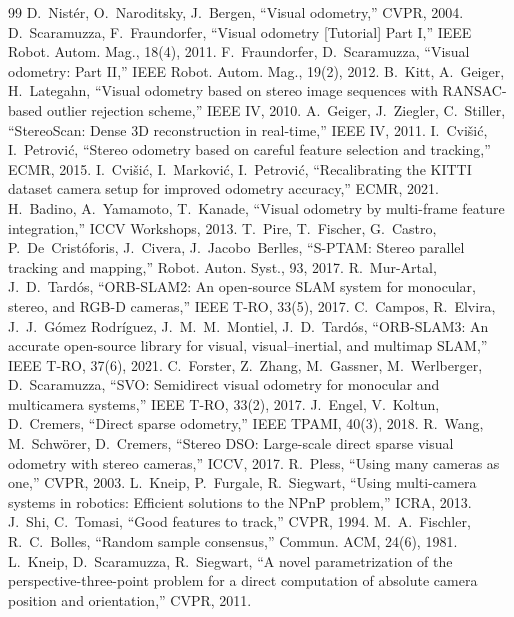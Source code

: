 \documentclass[11pt,a4paper]{article}
\begin{document}
\begingroup\small
\begin{thebibliography}{99}\setlength{\itemsep}{0pt}
 D.~Nist\'er, O.~Naroditsky, J.~Bergen, ``Visual odometry,'' CVPR, 2004.
 D.~Scaramuzza, F.~Fraundorfer, ``Visual odometry [Tutorial] Part I,'' IEEE Robot. Autom. Mag., 18(4), 2011.
 F.~Fraundorfer, D.~Scaramuzza, ``Visual odometry: Part II,'' IEEE Robot. Autom. Mag., 19(2), 2012.
 B.~Kitt, A.~Geiger, H.~Lategahn, ``Visual odometry based on stereo image sequences with RANSAC-based outlier rejection scheme,'' IEEE IV, 2010.
 A.~Geiger, J.~Ziegler, C.~Stiller, ``StereoScan: Dense 3D reconstruction in real-time,'' IEEE IV, 2011.
 I.~Cvi\v{s}i\'c, I.~Petrovi\'c, ``Stereo odometry based on careful feature selection and tracking,'' ECMR, 2015.
 I.~Cvi\v{s}i\'c, I.~Markovi\'c, I.~Petrovi\'c, ``Recalibrating the KITTI dataset camera setup for improved odometry accuracy,'' ECMR, 2021.
 H.~Badino, A.~Yamamoto, T.~Kanade, ``Visual odometry by multi-frame feature integration,'' ICCV Workshops, 2013.
 T.~Pire, T.~Fischer, G.~Castro, P.~De~Crist\'oforis, J.~Civera, J.~Jacobo~Berlles, ``S-PTAM: Stereo parallel tracking and mapping,'' Robot. Auton. Syst., 93, 2017.
 R.~Mur-Artal, J.~D.~Tard\'os, ``ORB-SLAM2: An open-source SLAM system for monocular, stereo, and RGB-D cameras,'' IEEE T-RO, 33(5), 2017.
 C.~Campos, R.~Elvira, J.~J.~G\'omez Rodr\'iguez, J.~M.~M.~Montiel, J.~D.~Tard\'os, ``ORB-SLAM3: An accurate open-source library for visual, visual--inertial, and multimap SLAM,'' IEEE T-RO, 37(6), 2021.
 C.~Forster, Z.~Zhang, M.~Gassner, M.~Werlberger, D.~Scaramuzza, ``SVO: Semidirect visual odometry for monocular and multicamera systems,'' IEEE T-RO, 33(2), 2017.
 J.~Engel, V.~Koltun, D.~Cremers, ``Direct sparse odometry,'' IEEE TPAMI, 40(3), 2018.
 R.~Wang, M.~Schw\"orer, D.~Cremers, ``Stereo DSO: Large-scale direct sparse visual odometry with stereo cameras,'' ICCV, 2017.
 R.~Pless, ``Using many cameras as one,'' CVPR, 2003.
 L.~Kneip, P.~Furgale, R.~Siegwart, ``Using multi-camera systems in robotics: Efficient solutions to the NPnP problem,'' ICRA, 2013.
 J.~Shi, C.~Tomasi, ``Good features to track,'' CVPR, 1994.
 M.~A.~Fischler, R.~C.~Bolles, ``Random sample consensus,'' Commun. ACM, 24(6), 1981.
 L.~Kneip, D.~Scaramuzza, R.~Siegwart, ``A novel parametrization of the perspective-three-point problem for a direct computation of absolute camera position and orientation,'' CVPR, 2011.

\end{thebibliography}
\end{document}
